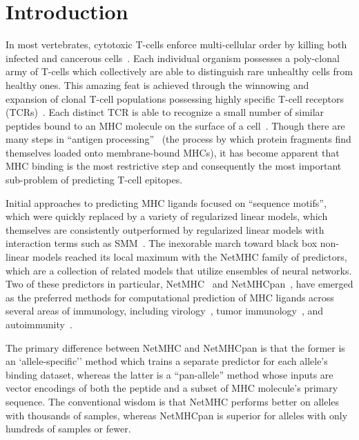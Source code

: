 \section{Introduction}
In most vertebrates, cytotoxic T-cells enforce multi-cellular order by killing both infected and cancerous cells~\cite{Anderson_2004}. Each individual organism possesses a poly-clonal army of T-cells which collectively are able to distinguish rare unhealthy cells from healthy ones. This amazing feat is achieved through the winnowing and expansion of clonal T-cell populations possessing highly specific T-cell receptors (TCRs)~\cite{Blackman_1990}. Each distinct TCR is able to recognize a small number of similar peptides bound to an MHC molecule on the surface of a cell~\cite{Huseby_2005}. Though there are many steps in ``antigen processing''~\cite{Cresswell_2005} (the process by which protein fragments find themselves loaded onto membrane-bound MHCs), it has become apparent that MHC binding is the most restrictive step and consequently the most important sub-problem of predicting T-cell epitopes. 

Initial approaches to predicting MHC ligands focused on ``sequence motifs''\cite{Sette_1989}, which were quickly replaced by a variety of regularized linear models, which themselves are consistently outperformed by regularized linear models with interaction terms such as SMM~\cite{Peters_2003}. The inexorable march toward black box non-linear models reached its local maximum with the NetMHC family of predictors, which are a collection of related models that utilize ensembles of neural networks. Two of these predictors in particular, NetMHC~\cite{Lundegaard_2008} and NetMHCpan~\cite{Nielsen_2007}, have emerged as the preferred methods for computational prediction of MHC ligands across several areas of immunology, including virology~\cite{Lund_2011}, tumor immunology~\cite{Gubin_2015}, and autoimmunity~\cite{Abreu_2012}. 

The primary difference between NetMHC and NetMHCpan is that the former is an `allele-specific'' method which trains a separate predictor for each allele's binding dataset, whereas the latter is a ``pan-allele'' method whose inputs are vector encodings of both the peptide and a subset of MHC molecule's primary sequence. The conventional wisdom is that NetMHC performs better on alleles with thousands of samples, whereas NetMHCpan is superior for alleles with only hundreds of samples or fewer. 



